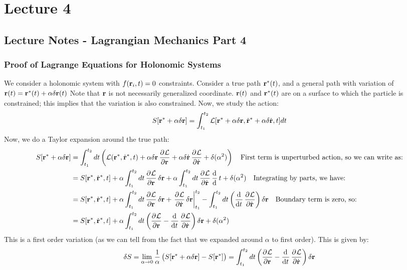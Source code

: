 \section{Lecture 4}
\subsection{Lecture Notes - Lagrangian Mechanics Part 4}
\subsubsection{Proof of Lagrange Equations for Holonomic Systems}
We consider a holonomic system with $f(\mathbf{r}_i, t) = 0$ constraints. Consider a true path $\mathbf{r}^*(t)$, and a general path with variation of $\mathbf{r}(t) = \mathbf{r}^*(t) + \alpha\delta\mathbf{r}(t)$ Note that $\mathbf{r}$ is not necessarily generalized coordinate. $\mathbf{r}(t)$ and $\mathbf{r}^*(t)$ are on a surface to which the particle is constrained; this implies that the variation is also constrained. Now, we study the action:
\[S[\mathbf{r}^* + \alpha\delta\mathbf{r}] = \int_{t_1}^{t_2} \mathcal{L}[\mathbf{r}^* + \alpha\delta\mathbf{r}, \dot{\mathbf{r}}^* + \alpha\delta\dot{\mathbf{r}}, t]dt\]
Now, we do a Taylor expansion around the true path:
\begin{align*}
    S[\v{r}^* + \alpha\delta\v{r}] &= \int_{t_1}^{t_2} dt\left(\LL(\v{r}^*, \dot{\v{r}}^*, t) + \alpha\delta\v{r}\dpd{\LL}{\v{r}} + \alpha\delta\dot{\v{r}}\dpd{\LL}{\dot{\v{r}}} + \delta(\alpha^2) \right) \quad \text{First term is unperturbed action, so we can write as:}
    \\ &= S[\v{r}^*, \dot{\v{r}}^*, t] + \alpha\int_{t_1}^{t_2}dt\dpd{\LL}{\v{r}}\delta\v{r} + \alpha\int_{t_1}^{t_2}dt\dpd{\LL}{\dot{\v{r}}}\dod{}{}t + \delta(\alpha^2)\quad\text{Integrating by parts, we have:}
    \\&= S[\v{r}^*, \dot{\v{r}}^*, t] + \alpha\int_{t_1}^{t_2}dt\dpd{\LL}{\v{r}}\delta\v{r} + \left. \dpd{\LL}{\dot{\v{r}}}\delta\v{r}\right|_{t_1}^{t_2} - \int_{t_1}^{t_2}dt\left(\dod{}{t}\dpd{\LL}{\dot{\v{r}}}\right)\delta\v{r}\quad\text{Boundary term is zero, so:}
    \\&= S[\v{r}^*, \dot{\v{r}}^*, t] + \alpha\int_{t_1}^{t_2}dt\left(\dpd{\LL}{\v{r}} - \dod{}{t}\dpd{\LL}{\dot{\v{r}}}\right)\delta\v{r} + \delta(\alpha^2)
\end{align*}
This is a first order variation (as we can tell from the fact that we expanded around $\alpha$ to first order). This is given by:
\[\delta S = \lim_{\alpha \rightarrow 0}\frac{1}{\alpha}\left(S[\v{r}^* + \alpha\delta\v{r}] -S[\v{r}^*]\right) = \int_{t_1}^{t_2}dt\left(\dpd{\LL}{\v{r}} - \dod{}{t}\dpd{\LL}{\dot{\v{r}}}\right)\delta\v{r}\]
